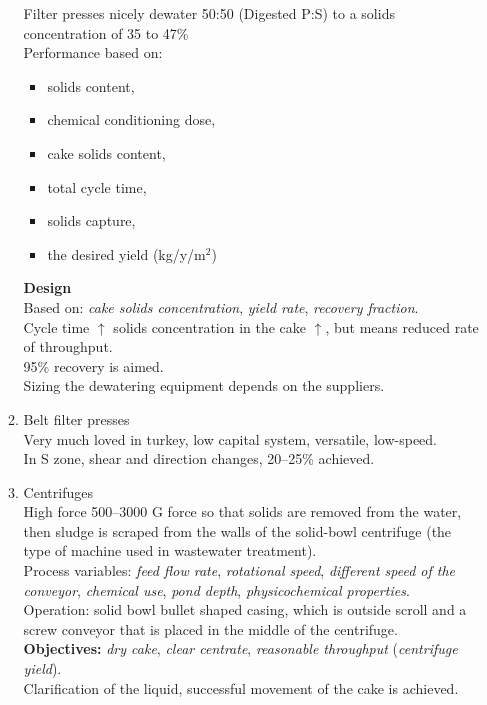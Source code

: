 \documentclass{article}
\numberwithin{equation}{section}
\begin{document}
\begin{enumerate}
\begin{enumerate}
        Filter presses nicely dewater 50:50 (Digested P:S) to a solids concentration of 35 to 47\%\\
        Performance based on:
        \begin{itemize}
            \item solids content,
            \item chemical conditioning dose,
            \item cake solids content,
            \item total cycle time,
            \item solids capture,
            \item the desired yield (kg/y/m$^2$)
        \end{itemize}
        \textbf{Design}\\
        Based on: \emph{cake solids concentration}, \emph{yield rate}, \emph{recovery fraction}.\\
        Cycle time $\uparrow$ solids concentration in the cake $\uparrow$, but means reduced rate of throughput.\\
        95\% recovery is aimed.\\
        Sizing the dewatering equipment depends on the suppliers.
        \item Belt filter presses\\
        Very much loved in turkey, low capital system, versatile, low-speed.\\
        In S zone, shear and direction changes, 20--25\% achieved.
        \item Centrifuges\\
        High force 500--3000 G force so that solids are removed from the water, then sludge is scraped from the walls of the solid-bowl centrifuge (the type of machine used in wastewater treatment).\\
        Process variables: \emph{feed flow rate}, \emph{rotational speed}, \emph{different speed of the conveyor}, \emph{chemical use}, \emph{pond depth}, \emph{physicochemical properties}.\\
        Operation: solid bowl bullet shaped casing, which is outside scroll and a screw conveyor that is placed in the middle of the centrifuge.\\
        \textbf{Objectives:} \emph{dry cake}, \emph{clear centrate}, \emph{reasonable throughput} (\emph{centrifuge yield}).\\
        Clarification of the liquid, successful movement of the cake is achieved.\\

\end{enumerate}
\end{enumerate}
\end{document}
